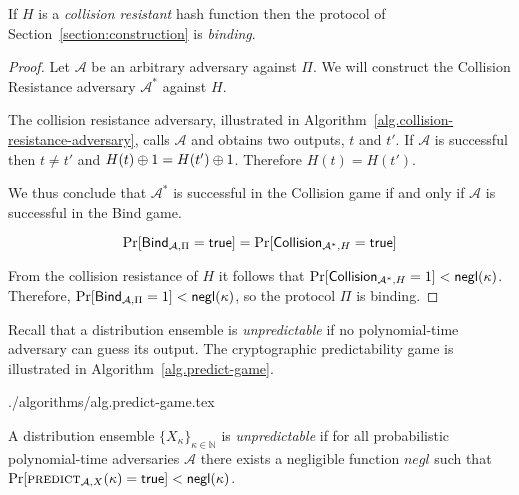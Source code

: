 \begin{theorem}[Binding]
  If $H$ is a \emph{collision resistant} hash function then the protocol of Section~\ref{section:construction} is \emph{binding}.
\end{theorem}
\begin{proof}
  Let $\mathcal{A}$ be an arbitrary adversary against $\Pi$.
  We will construct the Collision Resistance adversary $\mathcal{A}^*$ against $H$.

  The collision resistance adversary, illustrated in Algorithm~\ref{alg.collision-resistance-adversary}, calls $\mathcal{A}$ and obtains two outputs, $t$ and $t'$. If $\mathcal{A}$ is successful then $t \neq t'$ and $H(t) \oplus 1 = H(t') \oplus 1$. Therefore $H(t) = H(t')$.

  We thus conclude that $\mathcal{A^*}$ is successful in the \textsf{Collision} game if and only if $\mathcal{A}$ is successful in the \textsf{Bind} game.

  \[
    \Pr[\textsf{Bind}_{\mathcal{A},\Pi} = \mathsf{true}]
    =
    \Pr[\textsf{Collision}_{\mathcal{A}^*,H} = \mathsf{true}]
  \]

  From the collision resistance of $H$ it follows that $\Pr[\textsf{Collision}_{\mathcal{A}^*,H} = 1] < \textsf{negl}(\kappa)$. Therefore,
  $\Pr[\textsf{Bind}_{\mathcal{A},\Pi} = 1] < \textsf{negl}(\kappa)$, so
  the protocol $\Pi$ is binding.
\end{proof}

Recall that a distribution ensemble is \emph{unpredictable} if no
polynomial-time adversary can guess its output. The cryptographic
predictability game is illustrated in Algorithm~\ref{alg.predict-game}.

{./algorithms/alg.predict-game.tex}

\begin{definition}
  A distribution ensemble $\{X_{\kappa}\}_{\kappa\in\mathbb{N}}$ is
  \emph{unpredictable} if for all probabilistic polynomial-time adversaries
  $\mathcal{A}$ there exists a negligible function $negl$ such that
  $\Pr[\textsc{predict}_{\mathcal{A},X}(\kappa) = \mathsf{true}] < \textsf{negl}(\kappa)$.
\end{definition}

